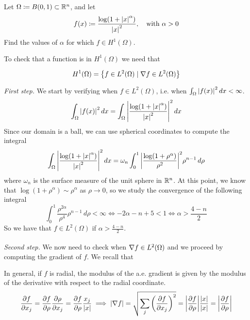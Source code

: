 \begin{exercise}
    Let \(\Omega \coloneqq B(0, 1) \subset \mathbb{R}^n\), and let
    \[
        f(x) \coloneqq \frac{\log(1+\abs{x}^\alpha)}{\abs{x}^2}, \quad \text{with } \alpha > 0
    \]
    Find the values of \(\alpha\) for which \(f \in H^1(\Omega)\).
\end{exercise}
To check that a function is in \(H^1(\Omega)\) we need that
\begin{remark}
    \[
        H^1(\Omega) = \left\{ f \in L^2(\Omega) \mid \nabla f \in L^2(\Omega) \right\}
    \]
\end{remark}
\textit{First step.} We start by verifying when \(f \in L^2(\Omega)\), i.e. when \(\int_\Omega \abs{f(x)}^2 \, dx < \infty\).
\[
    \begin{split}
        \int_\Omega \abs{f(x)}^2 \, dx = \int_\Omega \abs{\frac{\log(1+\abs{x}^\alpha)}{\abs{x}^2}}^2 \, dx
    \end{split}
\]
Since our domain is a ball, we can use spherical coordinates to compute the
integral
\begin{align*}
    \int_\Omega \abs{\frac{\log(1+\abs{x}^\alpha)}{\abs{x}^2}}^2 \, dx = \omega_n \int_0^1 \abs{\frac{\log(1+\rho^\alpha)}{\rho^2}}^2  \rho^{n-1} \, d\rho
\end{align*}
where \(\omega_n\) is the surface measure of the unit sphere in \(\mathbb{R}^n\).
At this point, we know that $\log(1+\rho^\alpha) \sim \rho^\alpha$ as $\rho \to 0$, so we study the convergence of the following integral
\begin{equation*}
    \int_0^1 \frac{\rho^{2\alpha}}{\rho^4} \rho^{n-1} \, d\rho < \infty \iff - 2 \alpha - n + 5 < 1 \iff \alpha > \frac{4-n}{2}
\end{equation*}
So we have that \(f \in L^2(\Omega)\) if \(\alpha > \frac{4-n}{2}\).\\
\vspace{0.1cm}\\
\textit{Second step.} We now need to check when \(\nabla f \in L^2(\Omega)\) and we proceed by computing the gradient of \(f\).
We recall that
\begin{remark}
    In general, if \(f\) is radial, the modulus of the a.e. gradient is given by the modulus of the derivative with respect to the radial coordinate.
    \begin{equation*}
        \frac{\partial f}{\partial x_j} = \frac{\partial f}{\partial \rho} \frac{\partial \rho}{\partial x_j} = \frac{\partial f}{\partial \rho} \frac{x_j}{\abs{x}}
        \implies \abs{\nabla f} = \sqrt{\sum_j \left(\frac{\partial f}{\partial x_j}\right)^2} = \abs{\frac{\partial f}{\partial \rho}} \frac{\abs{x}}{\abs{x}} = \abs{\frac{\partial f}{\partial \rho}}
    \end{equation*}
\end{remark}
